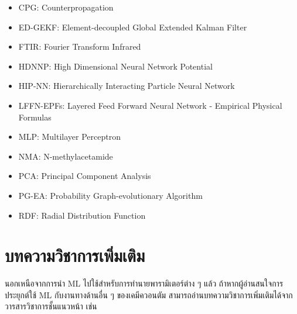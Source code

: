 \begin{itemize}[topsep=0pt,noitemsep]
    \item CPG: Counterpropagation
    
    \item ED-GEKF: Element-decoupled Global Extended Kalman Filter
    
    \item FTIR: Fourier Transform Infrared
    
    \item HDNNP: High Dimensional Neural Network Potential
    
    \item HIP-NN: Hierarchically Interacting Particle Neural Network
    
    \item LFFN-EPFs: Layered Feed Forward Neural Network - Empirical Physical Formulas
    
    \item MLP: Multilayer Perceptron
    
    \item NMA: N-methylacetamide
    
    \item PCA: Principal Component Analysis
    
    \item PG-EA: Probability Graph-evolutionary Algorithm
    
    \item RDF: Radial Distribution Function
\end{itemize}


\section{บทความวิชาการเพิ่มเติม}
\label{sec:pred_misc_papers}

นอกเหนือจากการนำ ML ไปใช้สำหรับการทำนายพารามิเตอร์ต่าง ๆ แล้ว ถ้าหากผู้อ่านสนใจการประยุกต์ใช้ ML กับงานทางด้านอื่น ๆ ของเคมีควอนตัม 
สามารถอ่านบทความวิชาการเพิ่มเติมได้จากวารสารวิชาการชั้นแนวหน้า เช่น 

